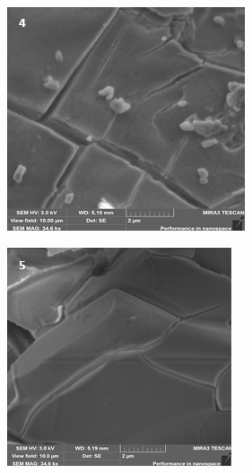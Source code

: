 \begin{figure}[H]
    \centering
    \begin{subfigure}[b]{0.32\textwidth}
        \centering
        \includegraphics[height=0.9\textwidth]{assets/48}
    \end{subfigure}
    \hfill
    \begin{subfigure}[b]{0.32\textwidth}
        \centering
        \includegraphics[height=0.9\textwidth]{assets/49}

\end{subfigure}
\end{figure}
